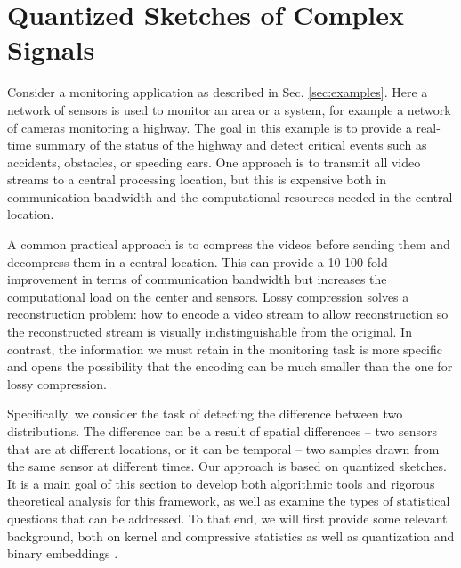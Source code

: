 \section{Quantized Sketches of Complex Signals}
\label{sec:QuantSketch}

Consider a monitoring application as described
in Sec. \ref{sec:examples}.  Here a network of sensors is used to
monitor an area or a system, for example a network of
cameras monitoring a highway. The goal in this example is to provide a real-time summary of the status of the highway
and detect critical events such as accidents, obstacles, or speeding cars. One approach is to transmit
all video streams to a central processing location, but this is expensive both in  communication
bandwidth and the computational resources needed in the central
location.

A common practical approach is to compress the videos before sending
them and decompress them in a central location. This 
can provide a 10-100 fold improvement in terms of communication
bandwidth but increases the computational load on the center and sensors.
Lossy compression solves a reconstruction problem: how to encode a
video stream to allow reconstruction
so the reconstructed stream is visually indistinguishable from the
original. In contrast, the information we must retain in the
monitoring task is more specific and opens the possibility that
the encoding can be much smaller than the one  for lossy
compression.

Specifically, we consider the task of detecting the difference between
two distributions. The difference can be a result of spatial
differences -- two sensors that are at different locations, or it can be
temporal -- two samples drawn from the same sensor at different times.
Our approach is based on quantized sketches.
 It is a main goal of this section to develop both algorithmic tools and rigorous theoretical analysis for this framework, as well as examine the types of statistical questions that can be addressed. 
To that
end, we will first provide some relevant background, both on kernel
and compressive statistics
\cite{gretton2012kernel,gribonval2017compressive,cheng2017two}
as well as quantization and binary embeddings \cite{jacques2013robust,SaabIEEEIT,saab2018quantization,huynh2018fast}.  
 

